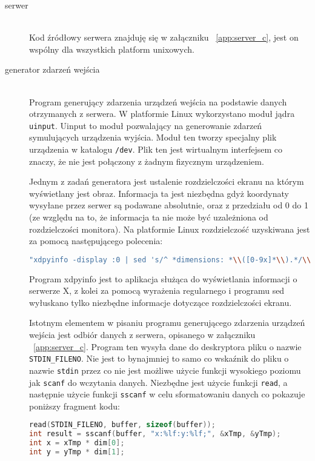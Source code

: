 \begin{description}
	\item[serwer] \hfill \\
Kod źródłowy serwera znajduję się w załączniku ~\ref{app:server_c}, jest on wspólny dla wszystkich platform unixowych.		
	\item[generator zdarzeń wejścia] \hfill \\ 
		Program generujący zdarzenia urządzeń wejścia na podstawie danych otrzymanych z serwera. W platformie Linux wykorzystano moduł jądra \lstinline{uinput}. Uinput to moduł pozwalający na generowanie zdarzeń symulujących urządzenia wyjścia. Moduł ten tworzy specjalny plik urządzenia w katalogu \lstinline{/dev}. Plik ten jest wirtualnym interfejsem co znaczy, że nie jest połączony z żadnym fizycznym urządzeniem.

		Jednym z zadań generatora jest ustalenie rozdzielczości ekranu na którym wyświetlany jest obraz. Informacja ta jest niezbędna gdyż koordynaty wysyłane przez serwer są podawane absolutnie, oraz z przedziału od 0 do 1 (ze względu na to, że informacja ta nie może być uzależniona od rozdzielczości monitora). Na platformie Linux rozdzielczość uzyskiwana jest za pomocą następującego polecenia:
\begin{lstlisting}[language=bash]
"xdpyinfo -display :0 | sed 's/^ *dimensions: *\\([0-9x]*\\).*/\\1/;t;d'";
\end{lstlisting}
		Program xdpyinfo jest to aplikacja służąca do wyświetlania informacji o serwerze X, z kolei za pomocą wyrażenia regularnego i programu sed wyłuskano tylko niezbędne informacje dotyczące rozdzielczości ekranu.

		Istotnym elementem w pisaniu programu generującego zdarzenia urządzeń wejścia jest odbiór danych z serwera, opisanego w załączniku ~\ref{app:server_c}. Program ten wysyła dane do deskryptora pliku o nazwie \lstinline{STDIN_FILENO}. Nie jest to bynajmniej to samo co wskaźnik do pliku o nazwie \lstinline{stdin} przez co nie jest możliwe użycie funkcji wysokiego poziomu jak \lstinline{scanf} do wczytania danych. Niezbędne jest użycie funkcji \lstinline{read}, a następnie użycie funkcji \lstinline{sscanf} w celu sformatowaniu danych co pokazuje poniższy fragment kodu:

\begin{lstlisting}[language=c]
read(STDIN_FILENO, buffer, sizeof(buffer));
int result = sscanf(buffer, "x:%lf:y:%lf;", &xTmp, &yTmp);
int x = xTmp * dim[0];
int y = yTmp * dim[1];
\end{lstlisting}


\end{description}
